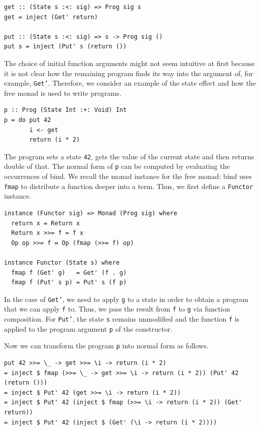 \documentclass[a4paper, 11pt, fleqn, twoside]{scrreprt}
\newcommand{\hinl}[1]{\texttt{#1}}
\begin{document}
\begin{verbatim}
get :: (State s :<: sig) => Prog sig s
get = inject (Get' return)

put :: (State s :<: sig) => s -> Prog sig ()
put s = inject (Put' s (return ())
\end{verbatim}

The choice of initial function arguments might not seem intuitive at first because it is not clear how the remaining program finds its way into the argument of, for example, \hinl{Get'}.
Therefore, we consider an example of the state effect and how the free monad is used to write programs.

\begin{verbatim}
p :: Prog (State Int :+: Void) Int
p = do put 42
       i <- get
       return (i * 2)
\end{verbatim}

The program sets a state \hinl{42}, gets the value of the current state and then returns double of that.
The normal form of \hinl{p} can be computed by evaluating the occurrences of bind.
We recall the monad instance for the free monad: bind uses \hinl{fmap} to distribute a function deeper into a term.
Thus, we first define a \hinl{Functor} instance.

\begin{verbatim}
instance (Functor sig) => Monad (Prog sig) where
  return x = Return x
  Return x >>= f = f x
  Op op >>= f = Op (fmap (>>= f) op)

instance Functor (State s) where
  fmap f (Get' g)   = Get' (f . g)
  fmap f (Put' s p) = Put' s (f p)
\end{verbatim}

In the case of \hinl{Get'}, we need to apply \hinl{g} to a state in order to obtain a program that we can apply \hinl{f} to.
Thus, we pass the result from \hinl{f} to \hinl{g} via function composition.
For \hinl{Put'}, the state \hinl{s} remains unmodified and the function \hinl{f} is applied to the program argument \hinl{p} of the constructor.

Now we can transform the program \hinl{p} into normal form as follows.

\begin{verbatim}
put 42 >>= \_ -> get >>= \i -> return (i * 2)
= inject $ fmap (>>= \_ -> get >>= \i -> return (i * 2)) (Put' 42 (return ()))
= inject $ Put' 42 (get >>= \i -> return (i * 2))
= inject $ Put' 42 (inject $ fmap (>>= \i -> return (i * 2)) (Get' return))
= inject $ Put' 42 (inject $ (Get' (\i -> return (i * 2))))
\end{verbatim}
\end{document}
